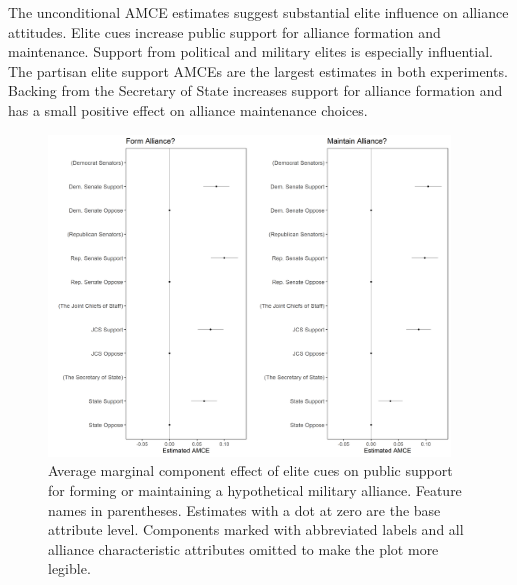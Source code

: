 \documentclass[12pt]{article}
\begin{document}
The unconditional AMCE estimates suggest substantial elite influence on alliance attitudes. 
Elite cues increase public support for alliance formation and maintenance. 
Support from political and military elites is especially influential.
The partisan elite support AMCEs are the largest estimates in both experiments.
Backing from the Secretary of State increases support for alliance formation and has a small positive effect on alliance maintenance choices. 


\begin{figure}
	\centering
		\includegraphics[width=0.95\textwidth]{../figures/joint-amce-plots-el.png}
	\caption{Average marginal component effect of elite cues on public support for forming or maintaining a hypothetical military alliance. Feature names in parentheses. Estimates with a dot at zero are the base attribute level. Components marked with abbreviated labels and all alliance characteristic attributes omitted to make the plot more legible.}
	\label{fig:joint-plot}
\end{figure}
\end{document}

